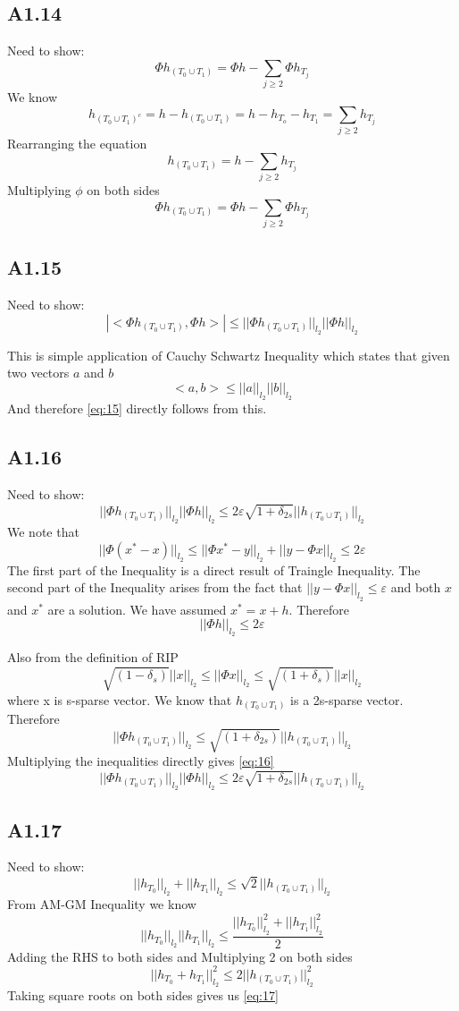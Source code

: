 \documentclass{article}
\newcommand{\ltwo}[1]{
  ||#1||_{l_2}
}
\newcommand{\htj}[1]{
  h_{T_{#1}}
}
\newcommand{\hto}[1]{
  h_{#1}
}
\newcommand{\htzo}{
  h_{(T_0 \cup T_1)}
}
\newcommand{\htzoc}{
  h_{(T_0 \cup T_1)^c}
}
\begin{document}
\subsection*{A1.14}
Need to show:
\begin{equation}
  \label{eq:14}
  \Phi \htzo = \Phi h - \sum_{j \ge 2}\Phi \htj{j}
\end{equation}
We know
$$\htzoc = h - \htzo =h - \hto{T_o} - \hto{T_1} = \sum_{j \ge 2}\htj{j}$$
Rearranging the equation
$$\htzo = h - \sum_{j \ge 2}\htj{j}$$
Multiplying $\phi$ on both sides
$$\Phi \htzo = \Phi h - \sum_{j \ge 2}\Phi \htj{j}$$

\subsection*{A1.15}
Need to show:
\begin{equation}
  \label{eq:15}
  |<\Phi\htzo,\Phi h>| \le \ltwo{\Phi\htzo}\ltwo{\Phi h}
\end{equation}

This is simple application of Cauchy Schwartz Inequality which states that given two vectors $a$ and $b$
$$<a,b> \le \ltwo{a}\ltwo{b}$$
And therefore \ref{eq:15} directly follows from this.

\subsection*{A1.16}
Need to show:
\begin{equation}
  \label{eq:16}
  \ltwo{\Phi\htzo}\ltwo{\Phi h} \le 2 \varepsilon \sqrt{1+\delta_{2s}}\ltwo{\htzo}
\end{equation}
We note that
$$\ltwo{\Phi(x^* - x)} \le \ltwo{\Phi x^* - y} + \ltwo{y - \Phi x} \le 2\varepsilon$$
The first part of the Inequality is a direct result of Traingle Inequality. The second part of the Inequality arises from the fact that
$\ltwo{y - \Phi x} \le \varepsilon$ and both $x$ and $x^*$ are a solution.
We have assumed $x^* = x + h$. Therefore
$$\ltwo{\Phi h} \le 2\varepsilon$$

Also from the definition of RIP
$$\sqrt{(1 - \delta_{s})} \ltwo{x} \le \ltwo{\Phi x} \le \sqrt{(1+\delta_s)} \ltwo{x}$$
where x is s-sparse vector.
We know that $\htzo$ is a 2s-sparse vector. Therefore
$$\ltwo{\Phi \htzo} \le \sqrt{(1+\delta_{2s})}\ltwo{\htzo}$$
Multiplying the inequalities directly gives \ref{eq:16}
$$\ltwo{\Phi\htzo}\ltwo{\Phi h} \le 2 \varepsilon \sqrt{1+\delta_{2s}}\ltwo{\htzo}$$

\subsection*{A1.17}
Need to show:
\begin{equation}
  \label{eq:17}
  \ltwo{\hto{T_0}} + \ltwo{\hto{T_1}} \le \sqrt{2}\ltwo{\htzo}
\end{equation}
From AM-GM Inequality we know
$$\ltwo{\hto{T_0}}\ltwo{\hto{T_1}} \le \frac{\ltwo{\hto{T_0}}^2 + \ltwo{\hto{T_1}}^2}{2}$$
Adding the RHS to both sides and Multiplying 2 on both sides
$$\ltwo{\hto{T_0} + \hto{T_1}}^2 \le 2\ltwo{\htzo}^2$$
Taking square roots on both sides gives us \ref{eq:17}
\end{document}
